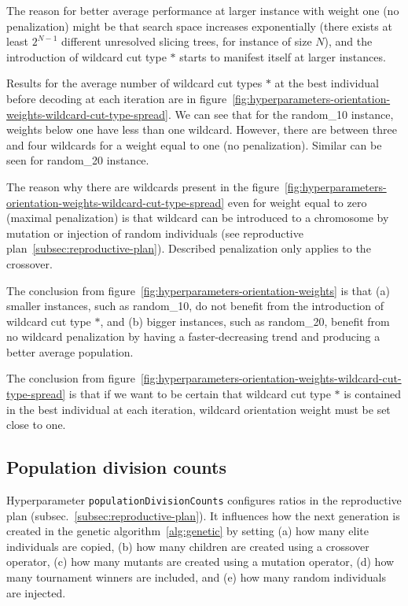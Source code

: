The reason for better average performance at larger instance with weight one (no penalization) might
be that search space increases exponentially (there exists at least $2^{N-1}$ different unresolved slicing trees, for instance of size $N$),
and the introduction of wildcard cut type $*$ starts to manifest itself at larger instances.

Results for the average number of wildcard cut types $*$ at the best individual before decoding at each iteration are in
figure~\ref{fig:hyperparameters-orientation-weights-wildcard-cut-type-spread}.
We can see that for the random\_10 instance, weights below one have less than one wildcard.
However, there are between three and four wildcards for a weight equal to one (no penalization).
Similar can be seen for random\_20 instance.

The reason why there are wildcards present in the figure~\ref{fig:hyperparameters-orientation-weights-wildcard-cut-type-spread}
even for weight equal to zero (maximal penalization) is that wildcard can be introduced to a chromosome by mutation or injection of random individuals (see reproductive plan~\ref{subsec:reproductive-plan}).
Described penalization only applies to the crossover.

The conclusion from figure~\ref{fig:hyperparameters-orientation-weights} is that (a) smaller instances, such as random\_10, do not benefit from the introduction of wildcard cut type $*$, and (b) bigger instances, such as random\_20, benefit from no wildcard penalization by having a faster-decreasing trend and producing a better average population.

The conclusion from figure~\ref{fig:hyperparameters-orientation-weights-wildcard-cut-type-spread} is that if we want to be certain that wildcard cut type $*$ is contained in the best individual at each iteration,
wildcard orientation weight must be set close to one.

\subsection{Population division counts}\label{subsec:population-division-counts}
Hyperparameter \verb|populationDivisionCounts| configures ratios in the reproductive plan (subsec.~\ref{subsec:reproductive-plan}).
It influences how the next generation is created in the genetic algorithm~\ref{alg:genetic}
by setting (a) how many elite individuals are copied, (b) how many children are created using a crossover operator,
(c) how many mutants are created using a mutation operator, (d) how many tournament winners are included, and (e) how many random individuals are injected.

